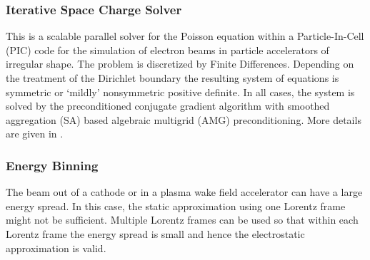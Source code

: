 
\subsubsection{Iterative Space Charge Solver}
This is a scalable parallel solver for the Poisson equation
  within a Particle-In-Cell (PIC) code for the simulation of electron
  beams in particle accelerators of irregular shape.  The problem is
  discretized by Finite Differences.  Depending on the treatment of the
  Dirichlet boundary the resulting system of equations is symmetric or
  `mildly' nonsymmetric positive definite.  In all cases, the system is
  solved by the preconditioned conjugate gradient algorithm with
  smoothed aggregation (SA) based algebraic multigrid (AMG)
  preconditioning.  More details are given in \cite{Adelmann:2009p543}.

\subsubsection{Energy Binning}
The beam out of a cathode or in a plasma wake field accelerator can have a large energy spread.
In this case, the static approximation using one Lorentz frame might not be sufficient. Multiple
Lorentz frames  can be used so that within each Lorentz frame the energy
spread is small and hence the electrostatic approximation is valid.
 \latermore



